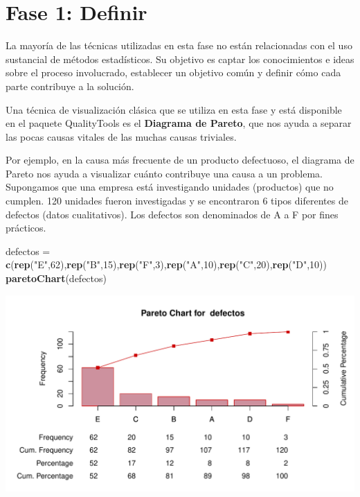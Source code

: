 \documentclass[
]{book}
\newenvironment{Shaded}{\begin{snugshade}}{\end{snugshade}}
\newcommand{\DecValTok}[1]{\textcolor[rgb]{0.00,0.00,0.81}{#1}}
\newcommand{\FunctionTok}[1]{\textcolor[rgb]{0.13,0.29,0.53}{\textbf{#1}}}
\newcommand{\NormalTok}[1]{#1}
\newcommand{\OtherTok}[1]{\textcolor[rgb]{0.56,0.35,0.01}{#1}}
\newcommand{\StringTok}[1]{\textcolor[rgb]{0.31,0.60,0.02}{#1}}
\begin{document}
\hypertarget{fase-1-definir}{%
\section{Fase 1: Definir}\label{fase-1-definir}}

La mayoría de las técnicas utilizadas en esta fase no están relacionadas con el uso sustancial de métodos estadísticos. Su objetivo es captar los conocimientos e ideas sobre el proceso involucrado, establecer un objetivo común y definir cómo cada parte contribuye a la solución.

Una técnica de visualización clásica que se utiliza en esta fase y está disponible en el paquete QualityTools es el \textbf{Diagrama de Pareto}, que nos ayuda a separar las pocas causas vitales de las muchas causas triviales.

Por ejemplo, en la causa más frecuente de un producto defectuoso, el diagrama de Pareto nos ayuda a visualizar cuánto contribuye una causa a un problema. Supongamos que una empresa está investigando unidades (productos) que no cumplen. 120 unidades fueron investigadas y se encontraron 6 tipos diferentes de defectos (datos cualitativos). Los defectos son denominados de A a F por fines prácticos.

\begin{Shaded}
\begin{Highlighting}[]
\NormalTok{defectos }\OtherTok{=} \FunctionTok{c}\NormalTok{(}\FunctionTok{rep}\NormalTok{(}\StringTok{"E"}\NormalTok{,}\DecValTok{62}\NormalTok{),}\FunctionTok{rep}\NormalTok{(}\StringTok{"B"}\NormalTok{,}\DecValTok{15}\NormalTok{),}\FunctionTok{rep}\NormalTok{(}\StringTok{"F"}\NormalTok{,}\DecValTok{3}\NormalTok{),}\FunctionTok{rep}\NormalTok{(}\StringTok{"A"}\NormalTok{,}\DecValTok{10}\NormalTok{),}\FunctionTok{rep}\NormalTok{(}\StringTok{"C"}\NormalTok{,}\DecValTok{20}\NormalTok{),}\FunctionTok{rep}\NormalTok{(}\StringTok{"D"}\NormalTok{,}\DecValTok{10}\NormalTok{))}
\FunctionTok{paretoChart}\NormalTok{(defectos)}
\end{Highlighting}
\end{Shaded}

\begin{center}\includegraphics{Libro_TidyQualityTools_files/figure-latex/unnamed-chunk-79-1} \end{center}
\end{document}
